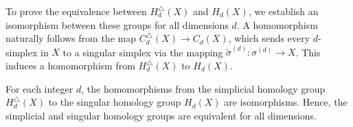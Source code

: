 To prove the equivalence between $H^{\triangle}_{d}(X)$ and $H_{d}(X)$, we establish an isomorphism between these groups for all dimensions $d$. A homomorphism naturally follows from the map $C^{\triangle}_{d}(X) \rightarrow C_{d}(X)$, which sends every $d$-simplex in $X$ to a singular simplex via the mapping $\tilde{\sigma}^{(d)}: \sigma^{(d)}\rightarrow X$. This induces a homomorphism from $H^{\triangle}_{d}(X)$ to $H_{d}(X)$.

\begin{theorem}{\cite[p.102f]{hatcher2005algebraic}}
	For each integer $d$, the homomorphisms from the simplicial homology group
	$H^{\triangle}_{d}(X)$ to the singular homology group $H_{d}(X)$ are isomorphisms.
	Hence, the simplicial and singular homology groups are equivalent for all
	dimensions.
\end{theorem}

